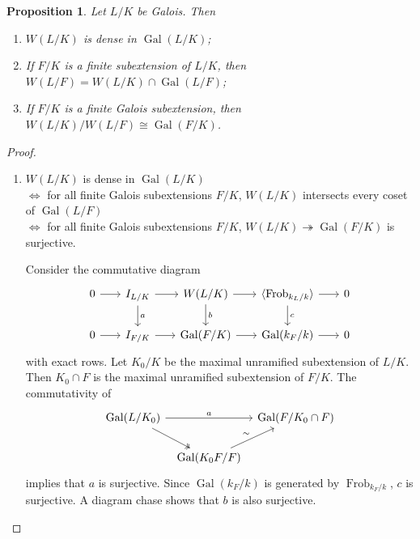 \documentclass[11pt]{article}
\theoremstyle{definition}
\theoremstyle{plain}
\newtheorem{proposition}[definition]{Proposition}
\theoremstyle{remark}
\DeclareMathOperator{\Gal}{Gal}
\DeclareMathOperator{\Frob}{Frob}
\begin{document}
\begin{proposition}\label{prop:16_8}
    Let $L/K$ be Galois. Then
    \begin{enumerate}
        \item $W(L/K)$ is dense in $\Gal(L/K)$;
        \item If $F/K$ is a finite subextension of $L/K$, then $W(L/F) = W(L/K) \cap \Gal(L/F)$;
        \item If $F/K$ is a finite Galois subextension, then $W(L/K)/W(L/F) \cong \Gal(F/K)$.
    \end{enumerate}
\end{proposition}
\begin{proof}\phantom{}
    \begin{enumerate}
        \item $W(L/K)$ is dense in $\Gal(L/K)$\\
            $\iff$ for all finite Galois subextensions $F/K$, $W(L/K)$ intersects every coset of $\Gal(L/F)$\\
            $\iff$ for all finite Galois subextensions $F/K$, $W(L/K) \twoheadrightarrow \Gal(F/K)$ is surjective.

            Consider the commutative diagram
            \begin{equation*}
            \begin{tikzcd}[column sep=scriptsize]
                0 \arrow[r] & I_{L/K} \arrow[r] \arrow[d, "a"] & W(L/K) \arrow[r] \arrow[d, "b"] & \langle \Frob_{k_L/k} \rangle \arrow[r] \arrow[d, "c"] & 0\\
                0 \arrow[r] & I_{F/K} \arrow[r] & \Gal(F/K) \arrow[r] & \Gal(k_F/k) \arrow[r] & 0
            \end{tikzcd}
            \end{equation*}
            with exact rows. Let $K_0/K$ be the maximal unramified subextension of $L/K$. Then $K_0 \cap F$ is the maximal unramified subextension of $F/K$. The commutativity of
            \begin{equation*}
            \begin{tikzcd}[column sep=tiny]
                \Gal(L/K_0) \arrow[rr, "a"] \arrow[rd, twoheadrightarrow] & & \Gal(F/K_0 \cap F) \\
                & \Gal(K_0 F / F) \arrow[ur, "\sim"]&
            \end{tikzcd}
            \end{equation*}
            implies that $a$ is surjective. Since $\Gal(k_F/k)$ is generated by $\Frob_{k_F/k}$, $c$ is surjective. A diagram chase shows that $b$ is also surjective.


\end{enumerate}
\end{proof}
\end{document}
